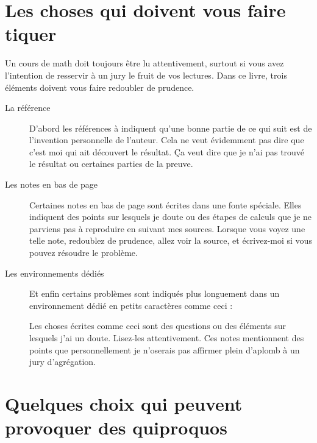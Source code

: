 \section{Les choses qui doivent vous faire tiquer}
\label{SECooWVHBooCaYoXP}

Un cours de math doit toujours être lu attentivement, surtout si vous avez l'intention de resservir à un jury le fruit de vos lectures. Dans ce livre, trois éléments doivent vous faire redoubler de prudence.

\begin{description}
    \item[La référence \cite{MonCerveau}] 
        D'abord les références à \cite{MonCerveau} indiquent qu'une bonne partie de ce qui suit est de l'invention personnelle de l'auteur. Cela ne veut évidemment pas dire que c'est moi qui ait découvert le résultat. Ça veut dire que je n'ai pas trouvé le résultat ou certaines parties de la preuve.
    \item[Les notes en bas de page]
        Certaines notes en bas de page sont écrites dans une fonte spéciale. Elles indiquent des points sur lesquels je doute ou des étapes de calculs que je ne parviens pas à reproduire en suivant mes sources. Lorsque vous voyez une telle note, redoublez de prudence, allez voir la source, et écrivez-moi si vous pouvez résoudre le problème.
    \item[Les environnements dédiés]       
        Et enfin certains problèmes sont indiqués plus longuement dans un environnement dédié en petits caractères comme ceci :

        \begin{probleme}
            Les choses écrites comme ceci sont des questions ou des éléments sur lesquels j'ai un doute. Lisez-les attentivement. Ces notes mentionnent des points que personnellement je n'oserais pas affirmer plein d'aplomb à un jury d'agrégation.
        \end{probleme}
\end{description}

\section{Quelques choix qui peuvent provoquer des quiproquos}

